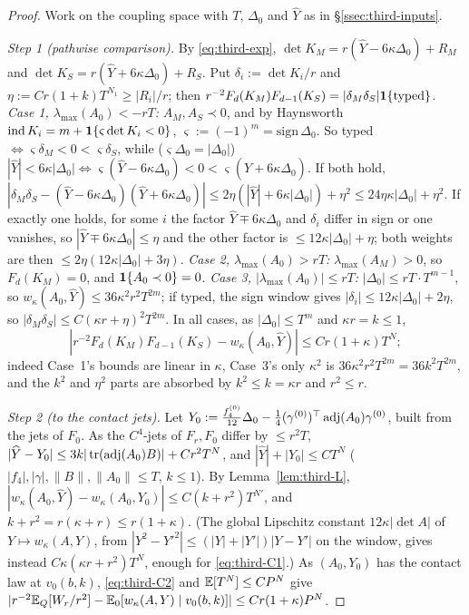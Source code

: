 \begin{proof}
Work on the coupling space with $T$, $\Delta_0$ and $\widehat Y$ as in \S\ref{ssec:third-inputs}.

\emph{Step 1 (pathwise comparison).} By \eqref{eq:third-exp}, $\det K_M=r(\widehat Y-6\kappa\Delta_0)+R_M$ and $\det K_S=r(\widehat Y+6\kappa\Delta_0)+R_S$. Put $\delta_i:=\det K_i/r$ and $\eta:=Cr(1+k)T^{N_1}\ge|R_i|/r$; then $r^{-2}F_d(K_M)F_{d-1}(K_S)=|\delta_M\delta_S|\mathbf 1\{\text{typed}\}$.
\emph{Case 1, $\lambda_{\max}(A_0)<-rT$:} $A_M,A_S\prec0$, and by Haynsworth $\operatorname{ind} K_i=m+\mathbf 1\{\varsigma\det K_i<0\}$, $\varsigma:=(-1)^m=\mathrm{sign}\,\Delta_0$. So typed $\iff\varsigma\delta_M<0<\varsigma\delta_S$, while ($\varsigma\Delta_0=|\Delta_0|$) $|\widehat Y|<6\kappa|\Delta_0|\iff\varsigma(\widehat Y-6\kappa\Delta_0)<0<\varsigma(\widehat Y+6\kappa\Delta_0)$. If both hold, $|\delta_M\delta_S-(\widehat Y-6\kappa\Delta_0)(\widehat Y+6\kappa\Delta_0)|\le2\eta(|\widehat Y|+6\kappa|\Delta_0|)+\eta^2\le24\eta\kappa|\Delta_0|+\eta^2$. If exactly one holds, for some $i$ the factor $\widehat Y\mp6\kappa\Delta_0$ and $\delta_i$ differ in sign or one vanishes, so $|\widehat Y\mp6\kappa\Delta_0|\le\eta$ and the other factor is $\le12\kappa|\Delta_0|+\eta$; both weights are then $\le2\eta(12\kappa|\Delta_0|+3\eta)$.
\emph{Case 2, $\lambda_{\max}(A_0)>rT$:} $\lambda_{\max}(A_M)>0$, so $F_d(K_M)=0$, and $\mathbf 1\{A_0\prec0\}=0$.
\emph{Case 3, $|\lambda_{\max}(A_0)|\le rT$:} $|\Delta_0|\le rT\cdot T^{m-1}$, so $w_\kappa(A_0,\widehat Y)\le36\kappa^2r^2T^{2m}$; if typed, the sign window gives $|\delta_i|\le12\kappa|\Delta_0|+2\eta$, so $|\delta_M\delta_S|\le C(\kappa r+\eta)^2T^{2m}$.
In all cases, as $|\Delta_0|\le T^m$ and $\kappa r=k\le1$,
\begin{equation}\label{eq:third-C2}
|r^{-2}F_d(K_M)F_{d-1}(K_S)-w_\kappa(A_0,\widehat Y)|\le Cr(1+\kappa)T^N;
\end{equation}
indeed Case~1's bounds are linear in $\kappa$, Case~3's only $\kappa^2$ is $36\kappa^2r^2T^{2m}=36k^2T^{2m}$, and the $k^2$ and $\eta^2$ parts are absorbed by $k^2\le k=\kappa r$ and $r^2\le r$.

\emph{Step 2 (to the contact jets).} Let $Y_0:=\frac{f_4^{(0)}}{12}\Delta_0-\frac14(\gamma^{(0)})^\top\operatorname{adj}(A_0)\gamma^{(0)}$, built from the jets of $F_0$. As the $C^4$-jets of $F_r,F_0$ differ by $\le r^2T$, $|\widehat Y-Y_0|\le3k|\operatorname{tr}(\operatorname{adj}(A_0)B)|+Cr^2T^N$, and $|\widehat Y|+|Y_0|\le CT^N$ ($|f_4|,|\gamma|,\|B\|,\|A_0\|\le T$, $k\le1$). By Lemma~\ref{lem:third-L}, $|w_\kappa(A_0,\widehat Y)-w_\kappa(A_0,Y_0)|\le C(k+r^2)T^{N'}$, and $k+r^2=r(\kappa+r)\le r(1+\kappa)$. (The global Lipschitz constant $12\kappa|\det A|$ of $Y\mapsto w_\kappa(A,Y)$, from $|Y^2-Y'^2|\le(|Y|+|Y'|)|Y-Y'|$ on the window, gives instead $C\kappa(\kappa r+r^2)T^N$, enough for \eqref{eq:third-C1}.) As $(A_0,Y_0)$ has the contact law at $v_0(b,k)$, \eqref{eq:third-C2} and $\mathbb E[T^N]\le CP^N$ give $|r^{-2}\mathbb E_Q[W_r/r^2]-\mathbb E_0[w_\kappa(A,Y)\mid v_0(b,k)]|\le Cr(1+\kappa)P^N$.


\end{proof}
